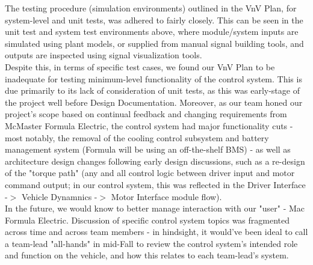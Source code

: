 \documentclass[12pt, titlepage]{article}
\begin{document}
The testing procedure (simulation environments) outlined in the VnV Plan, for system-level and unit tests, was adhered to fairly closely. This can be seen in the unit test and system test environments above, where module/system inputs are simulated using plant models, or supplied from manual signal building tools, and outputs are inspected using signal visualization tools.\\
Despite this, in terms of specific test cases, we found our VnV Plan to be inadequate for testing minimum-level functionality of the control system. This is due primarily to its lack of consideration of unit tests, as this was early-stage of the project well before Design Documentation. Moreover, as our team honed our project's scope based on continual feedback and changing requirements from McMaster Formula Electric, the control system had major functionality cuts - most notably, the removal of the cooling control subsystem and battery management system (Formula will be using an off-the-shelf BMS) - as well as architecture design changes following early design discussions, such as a re-design of the "torque path" (any and all control logic between driver input and motor command output; in our control system, this was reflected in the Driver Interface -$>$ Vehicle Dynamnics -$>$ Motor Interface module flow). \\
In the future, we would know to better manage interaction with our "user" - Mac Formula Electric. Discussion of specific control system topics was fragmented across time and across team members - in hindsight, it would've been ideal to call a team-lead "all-hands" in mid-Fall to review the control system's intended role and function on the vehicle, and how this relates to each team-lead's system.
\end{document}
